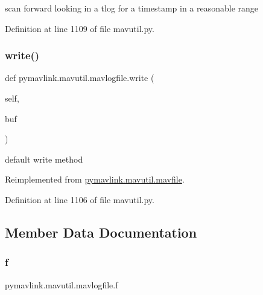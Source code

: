\begin{DoxyVerb}scan forward looking in a tlog for a timestamp in a reasonable range\end{DoxyVerb}
 

Definition at line 1109 of file mavutil.\+py.

\mbox{\label{classpymavlink_1_1mavutil_1_1mavlogfile_a286beed914444073324880af5f611505}} 
\subsubsection{\texorpdfstring{write()}{write()}}
{\footnotesize\ttfamily def pymavlink.\+mavutil.\+mavlogfile.\+write (\begin{DoxyParamCaption}\item[{}]{self,  }\item[{}]{buf }\end{DoxyParamCaption})}

\begin{DoxyVerb}default write method\end{DoxyVerb}
 

Reimplemented from \mbox{\hyperlink{classpymavlink_1_1mavutil_1_1mavfile_a8f40348c156083384c07dfa73cf92a62}{pymavlink.\+mavutil.\+mavfile}}.



Definition at line 1106 of file mavutil.\+py.



\subsection{Member Data Documentation}
\mbox{\label{classpymavlink_1_1mavutil_1_1mavlogfile_a07d6541957a04a31a47469a54b96a094}} 
\subsubsection{\texorpdfstring{f}{f}}
{\footnotesize\ttfamily pymavlink.\+mavutil.\+mavlogfile.\+f}



